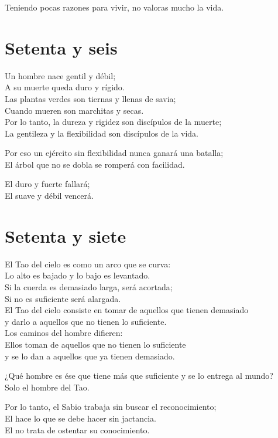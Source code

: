 \documentclass[hidelinks]{memoir}
\begin{document}
	Teniendo pocas razones para vivir, no valoras mucho la vida.
	
	\chapter*{Setenta y seis}
	
	Un hombre nace gentil y débil;\\
	A su muerte queda duro y rígido.\\
	Las plantas verdes son tiernas y llenas de savia;\\
	Cuando mueren son marchitas y secas.\\
	Por lo tanto, la dureza y rigidez son discípulos de la muerte;\\
	La gentileza y la flexibilidad son discípulos de la vida.
	
	Por eso un ejército sin flexibilidad nunca ganará una batalla;\\
	El árbol que no se dobla se romperá con facilidad.
	
	El duro y fuerte fallará;\\
	El suave y débil vencerá.
	
	\chapter*{Setenta y siete}
	
	El Tao del cielo es como un arco que se curva:\\
	Lo alto es bajado y lo bajo es levantado.\\
	Si la cuerda es demasiado larga, será acortada;\\
	Si no es suficiente será alargada.\\
	El Tao del cielo consiste en tomar de aquellos que tienen demasiado\\
	y darlo a aquellos que no tienen lo suficiente.\\
	Los caminos del hombre difieren:\\
	Ellos toman de aquellos que no tienen lo suficiente\\
	y se lo dan a aquellos que ya tienen demasiado.
	
	¿Qué hombre es ése que tiene más que suficiente y se lo entrega al
	mundo?\\
	Solo el hombre del Tao.
	
	Por lo tanto, el Sabio trabaja sin buscar el reconocimiento;\\
	El hace lo que se debe hacer sin jactancia.\\
	El no trata de ostentar su conocimiento.
	
\end{document}
